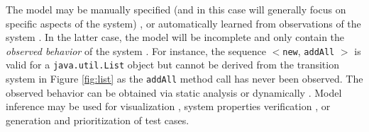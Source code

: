 The model may be manually specified (and in this case will generally focus on specific aspects of the system) \cite{Utting2007}, or automatically learned from observations of the system \cite{Herbold2017, Leemans2018, Sprenkle2013, Sprenkle2011a, Tonella2014, Verwer2017}.
In the latter case, the model will be incomplete and only contain the \emph{observed behavior} of the system \cite{Tonella2012}. For instance, the sequence $<$\texttt{new}, \texttt{addAll} $>$ is valid for a \texttt{java.util.List} object but cannot be derived from the transition system in Figure \ref{fig:list} as the \texttt{addAll} method call has never been observed.
%
The observed behavior can be obtained via static analysis \cite{Fraser2011a} or dynamically \cite{Krka:2010:UDE:1810295.1810324}. Model inference may be used for visualization \cite{Leemans2018, Verwer2017}, system properties verification \cite{Lorenzoli2008a, Ghezzi2014}, or generation \cite{Herbold2017, Sprenkle2013, Sprenkle2011a, Prowell2004, Zhang2015a, Fraser2011a} and prioritization \cite{Devroey2017b, Dulz2003} of test cases.



